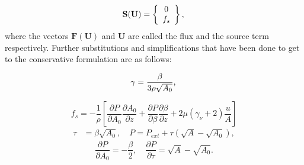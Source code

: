 \documentclass[a4paper, oneside]{discothesis}
\begin{document}
\begin{equation}
	\mathbf{S}(\mathbf{U})=\left\{\begin{array}{c}
			0 \\

			f_s
	\end{array}\right\}, \\
\end{equation}
where the vectors $\mathbf{F}(\mathbf{U})$ and $\mathbf{U}$ are called the flux and the source term respectively.
Further substitutions and simplifications that have been done to get to the conservative formulation are as follows:

\begin{equation}
	\gamma=\frac{\beta}{3 \rho \sqrt{A_0}}, \\
\end{equation}

\begin{equation}
	f_s=-\frac{1}{\rho}\left[\frac{\partial P}{\partial A_0} \frac{\partial A_0}{\partial z}+\frac{\partial P}{\partial \beta} \frac{\partial \beta}{\partial z}+2 \mu\left(\gamma_\nu+2\right) \frac{u}{A}\right]
\end{equation}
\begin{equation}
	\begin{aligned}
		\tau & =\beta \sqrt{A_0}, \quad P=P_{e x t}+\tau\left(\sqrt{A}-\sqrt{A_0}\right),
	\end{aligned}
\end{equation}
\begin{equation}
	\frac{\partial P}{\partial A_0}=-\frac{\beta}{2}, \quad \frac{\partial P}{\partial \tau}=\sqrt{A}-\sqrt{A_0}.
\end{equation}
\begin{comment}
	The flux Jacobian reads
	\begin{equation}
		\frac{\partial \mathbf{F}}{\partial \mathbf{U}}=\mathbf{H}=\left[\begin{array}{cc}
				0 & 1 \\
				\frac{3}{2} \chi \sqrt{A}-u^2 & 2 u
		\end{array}\right],
	\end{equation}
	which, under the assumption $A>0$, has two eigenvalues
	\begin{equation}
		\lambda_{1,2}=u \mp c, \quad c=\sqrt{\frac{3}{2} \gamma \sqrt{A}}=\sqrt{\frac{\beta}{2 \rho}} A^{1 / 4}
	\end{equation}
\end{comment}
\end{document}
